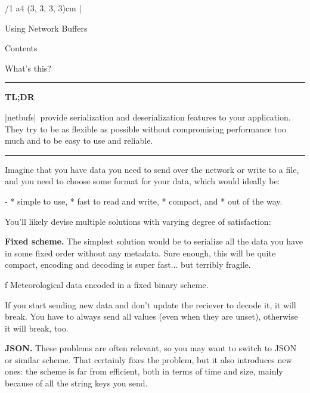 

\margins/1 a4 (3, 3, 3, 3)cm
\typosize [13/15]
\activettchar|

\def\nb{|netbufs|}

\def\hnote#1#2{
	\medskip
	\hrule
	\medskip
	\par\noindent
	{\bf #1}
	\noindent
	\par\noindent#2
	\medskip
	\hrule
	\medskip
}

\def\img#1#2{
	\bigskip
    \centerline{
		\inspic{#1}
    }
	\caption/f #2
	\bigskip
}

\tit Using Network Buffers

\nonum\notoc\sec Contents
\maketoc

\sec What's this?

\hnote{TL;DR}{%
	\nb\ provide serialization and deserialization features to your application.
	They try to be as flexible as possible without compromising performance too
	much and to be easy to use and reliable.
}

\noindent
Imagine that you have data you need to send over the network or write to a
file, and you
need to choose some format for your data, which would ideally be:

\begitems\style -
	* simple to use,
	* fast to read and write,
	* compact, and
	* out of the way.
\enditems

\noindent
You'll likely devise multiple solutions with varying degree of satisfaction:

{\bf Fixed scheme.} The simplest solution would be to serialize all the data
you have in some fixed order without any metadata. Sure enough, this will be
quite compact, encoding and decoding is super fast$\dots$ but terribly fragile.

\img{images/fixed.pdf}{Meteorological data encoded in a fixed binary scheme.}

If you start sending new data and
don't update the reciever to decode it, it will break. You have to always send
all values (even when they are unset), otherwise it will break, too.

\noindent
{\bf JSON.} These problems are often relevant, so you may want to
switch to JSON or similar scheme. That certainly fixes the problem, but it also
introduces new ones: the scheme is far from efficient, both in terms of time
and size, mainly because of all the string keys you send.

